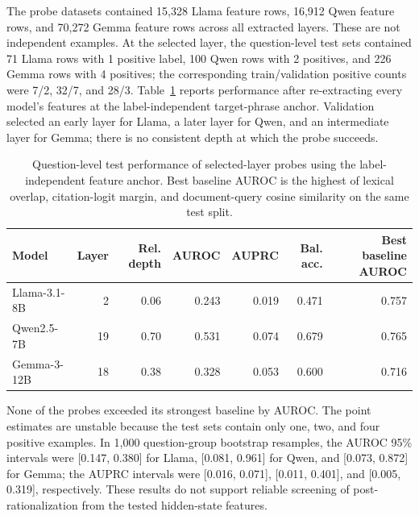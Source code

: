\documentclass[a4paper,fleqn]{cas-sc}
\begin{document}
The probe datasets contained 15,328 Llama feature rows, 16,912 Qwen feature rows, and 70,272 Gemma feature rows across all extracted layers. These are not independent examples. At the selected layer, the question-level test sets contained 71 Llama rows with 1 positive label, 100 Qwen rows with 2 positives, and 226 Gemma rows with 4 positives; the corresponding train/validation positive counts were 7/2, 32/7, and 28/3. Table~\ref{tab:probes} reports performance after re-extracting every model's features at the label-independent target-phrase anchor. Validation selected an early layer for Llama, a later layer for Qwen, and an intermediate layer for Gemma; there is no consistent depth at which the probe succeeds.

\begin{table}[t]
\centering
\small
\begin{tabular}{lrrrrrr}
\toprule
Model & Layer & Rel. depth & AUROC & AUPRC & Bal. acc. & Best baseline AUROC \\
\midrule
Llama-3.1-8B & 2 & 0.06 & 0.243 & 0.019 & 0.471 & 0.757 \\
Qwen2.5-7B & 19 & 0.70 & 0.531 & 0.074 & 0.679 & 0.765 \\
Gemma-3-12B & 18 & 0.38 & 0.328 & 0.053 & 0.600 & 0.716 \\
\bottomrule
\end{tabular}
\caption{Question-level test performance of selected-layer probes using the label-independent feature anchor. Best baseline AUROC is the highest of lexical overlap, citation-logit margin, and document-query cosine similarity on the same test split.}
\label{tab:probes}
\end{table}

None of the probes exceeded its strongest baseline by AUROC. The point estimates are unstable because the test sets contain only one, two, and four positive examples. In 1,000 question-group bootstrap resamples, the AUROC 95\% intervals were [0.147, 0.380] for Llama, [0.081, 0.961] for Qwen, and [0.073, 0.872] for Gemma; the AUPRC intervals were [0.016, 0.071], [0.011, 0.401], and [0.005, 0.319], respectively. These results do not support reliable screening of post-rationalization from the tested hidden-state features.
\end{document}
